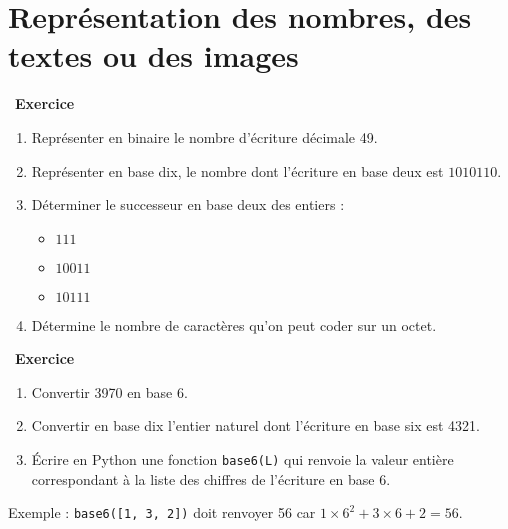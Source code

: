 \documentclass[
  11pt,
]{article}
\newcommand{\passthrough}[1]{#1}
\providecommand{\tightlist}{%
  \setlength{\itemsep}{0pt}\setlength{\parskip}{0pt}}
\newcounter{exo}
\newenvironment{exercice}[1]
{\par \medskip   \addtocounter{exo}{1} \noindent  
\begin{bclogo}[arrondi =0.1,   noborder = true, logo=\bccrayon, marge=4]{~\textbf{Exercice} \textbf{\theexo} {\itshape #1} }  \par}
{
\end{bclogo}
 \par \bigskip }
\newcounter{def}
\begin{document}
\hypertarget{repruxe9sentation-des-nombres-des-textes-ou-des-images}{%
\section{Représentation des nombres, des textes ou des
images}\label{repruxe9sentation-des-nombres-des-textes-ou-des-images}}

\begin{exercice}{}

\begin{enumerate}
\def\labelenumi{\arabic{enumi}.}
\tightlist
\item
  Représenter en binaire le nombre d'écriture décimale 49.
\item
  Représenter en base dix, le nombre dont l'écriture en base deux est
  \(1010110\).
\item
  Déterminer le successeur en base deux des entiers :

  \begin{itemize}
  \tightlist
  \item
    \(111\)
  \item
    \(10011\)
  \item
    \(10111\)
  \end{itemize}
\item
  Détermine le nombre de caractères qu'on peut coder sur un octet.
\end{enumerate}

\end{exercice}

\begin{exercice}{}

\begin{enumerate}
\def\labelenumi{\arabic{enumi}.}
\tightlist
\item
  Convertir 3970 en base 6.
\item
  Convertir en base dix l'entier naturel dont l'écriture en base six est
  4321.
\item
  Écrire en Python une fonction \passthrough{\lstinline!base6(L)!} qui
  renvoie la valeur entière correspondant à la liste des chiffres de
  l'écriture en base 6.
\end{enumerate}

Exemple : \passthrough{\lstinline!base6([1, 3, 2])!} doit renvoyer 56
car \(1 \times 6^{2} + 3 \times 6 + 2 = 56\).

\end{exercice}
\end{document}
